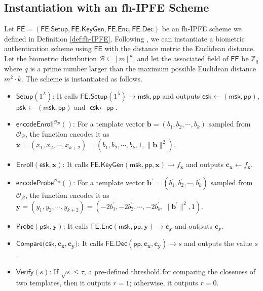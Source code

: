 
\subsection{Instantiation with an fh-IPFE Scheme}
\label{sec:fh-IPFE-instantiation}

Let $\textsf{FE} = (\textsf{FE.Setup}, \textsf{FE.KeyGen}, \textsf{FE.Enc}, \textsf{FE.Dec})$ be an fh-IPFE scheme we defined in Definition \ref{def:fh-IPFE}. Following \cite{cryptoeprint:2023/481}, we can instantiate a biometric authentication scheme using $\textsf{FE}$ with the distance metric the Euclidean distance. Let the biometric distribution $\mathcal{B} \subseteq [m]^k$, and let the associated field of $\textsf{FE}$ be $\mathbb{Z}_q$ where $q$ is a prime number larger than the maximum possible Euclidean distance $m^2 \cdot k$. The scheme is instantiated as follows.

\begin{itemize}

	\item $\textsf{Setup}(1^\lambda)$: It calls $\textsf{FE.Setup}(1^\lambda) \to \textsf{msk}, \textsf{pp}$ and outputs $\textsf{esk} \gets (\textsf{msk}, \textsf{pp})$, $\textsf{psk} \gets (\textsf{msk}, \textsf{pp})$ and $\textsf{csk} \gets \textsf{pp}$.

	\item $\textsf{encodeEnroll}^{\mathcal{O}_{\mathcal{B}}}()$: For a template vector $\mathbf{b} = (b_1, b_2, \cdots, b_k)$ sampled from $\mathcal{O}_{\mathcal{B}}$, the function encodes it as $\mathbf{x} = (x_1, x_2, \cdots, x_{k+2}) = (b_1, b_2, \cdots, b_k, 1, \|\mathbf{b}\|^2)$. 

	\item $\textsf{Enroll}(\textsf{esk}, \mathbf{x})$: It calls $\textsf{FE.KeyGen}(\textsf{msk}, \textsf{pp}, \mathbf{x}) \to f_\mathbf{x}$ and outputs $\mathbf{c_x} \gets f_\mathbf{x}$.

	\item $\textsf{encodeProbe}^{\mathcal{O}_{\mathcal{B}}}()$: For a template vector $\mathbf{b}^\prime = (b_1^\prime, b_2^\prime, \cdots, b_k^\prime)$ sampled from $\mathcal{O}_{\mathcal{B}}$, the function encodes it as $\mathbf{y} = (y_1, y_2, \cdots, y_{k+2}) = (-2b_1^\prime, -2b_2^\prime, \cdots, -2b_k^\prime, \|\mathbf{b}^\prime\|^2, 1)$.

	\item $\textsf{Probe}(\textsf{psk}, \mathbf{y})$: It calls $\textsf{FE.Enc}(\textsf{msk}, \textsf{pp}, \mathbf{y}) \to \mathbf{c_y}$ and outputs $\mathbf{c_y}$.

	\item $\textsf{Compare}(\textsf{csk}, \mathbf{c_x}, \mathbf{c_y)}$: It calls $\textsf{FE.Dec}(\textsf{pp}, \mathbf{c_x}, \mathbf{c_y}) \to s$ and outputs the value $s$.

	\item $\textsf{Verify}(s)$: If $\sqrt{s} \leq \tau$, a pre-defined threshold for comparing the closeness of two templates, then it outputs $r = 1$; otherwise, it outputs $r = 0$.

\end{itemize}

